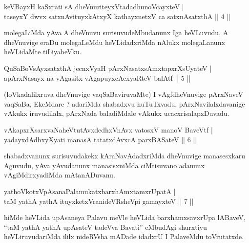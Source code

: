 
\begin{shl}
keVBayxH kaSxrati sA dheVnuriteyxVtadadhunoVcayxteV | \\
taseyxY dwvx satxnAvituyxkAtxyX kathayxnetxV ca satxnAsatxthA \hfill ||  4 ||
\end{shl}

\begin{artha}
molegaLiMda yAva A dheVnuvu surisuvudeMbudanunx Iga heVLuvudu, A dheVnuvige eraDu molegaLeMdu heVLidadxriMda nAlukx molegaLanunx heVLidaMte tiLiyabeVku.
\end{artha}


\begin{shl}
QuSaBoV\s sAyxsatxthA jecnxVyaH pArxNasatxsAmxtapxrXsUyateV | \\
apArxNasayx na vAgasitx vAgapuyxcAcxyaRteV balAtf \hfill ||  5 || 
\end{shl}

\begin{artha}
(loVkadalilxruva dheVnuvige vaqSaBaviruvaMte) I vAgfdheVnuvige pArxNaveV vaqSaBa, EkeMdare ? adariMda shabadxvu huTuTxvadu, pArxNavilalxdavanige vAkukx iruvudilalx, pArxNada baladiMdale vAkukx ucacxrisalapxDuvadu.
\end{artha}


\begin{shl}
vAkapxrXsarxvaNaheVtutAvxdedhxVnAvx vatosxV manoV BaveVtf | \\
yadayxdAdhxyXyati manasA tatatxdAvxcA parxBASateV \hfill ||  6 || 
\end{shl}

\begin{artha}
shabadxvanunx surisuvudakekx kAraNavAdadxriMda dheVnuvige manasesxkaru Aguvudu, yAva yAvudanunx manasisxniMda ciMtisuvano adanunx vAgiMdirxyadiMda mAtanADuvanu.
\end{artha}

\begin{shl}
yathoVkotxVpAsanaPalamukatxbarxhAmxtamxrUpatA | \\
taM yathA yathA ituyxketxVranideVRsheV\s pi gamayxteV \hfill ||  7 || 
\end{shl}

\begin{artha}
hiMde heVLida upAsaneya Palavu meVle heVLida barxhamxsavxrUpa lABaveV, ``taM yathA yathA upAsateV tadeVva Bavati'' eMbudAgi shurxtiyu heVLiruvudariMda ililx nideRVsha mADade idadxrU I PalaveMdu toVrutatxde.
\end{artha}

